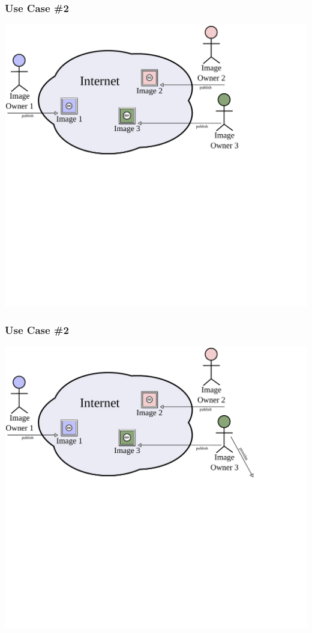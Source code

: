 \documentclass[mathserif,xcolor=dvipsnames,hyperref={bookmarks=true}]{beamer}
\begin{document}
    \begin{frame}[t]
        \frametitle{Use Case \#2}
        \begin{center}
            \includegraphics[width=0.9\textheight]{../resources/usecases/usecase2/usecase2-step10.pdf}
        \end{center}
    \end{frame}
    \begin{frame}[t]
        \frametitle{Use Case \#2}
        \begin{center}
            \includegraphics[width=0.9\textheight]{../resources/usecases/usecase2/usecase2-step11.pdf}
        \end{center}
    \end{frame}
\end{document}
